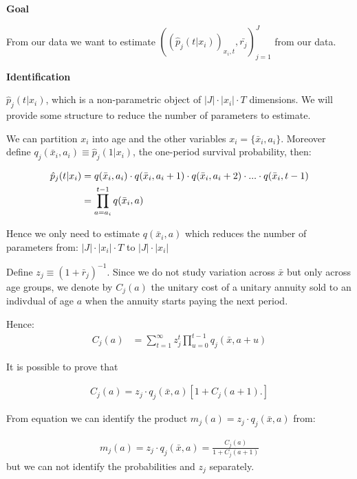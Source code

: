 \documentclass[12pt]{article}
\theoremstyle{plain}
\theoremstyle{plain}
\begin{document}
\textbf{Goal}

From our data we want to estimate 
$((\hat{p}_{j}(t|x_{i}))_{x_i,t},  \bar{r_{j}})_{j=1}^J$ from our data.

\textbf{Identification}


$\hat{p}_{j}(t|x_{i})$, which is a non-parametric object of $|J|\cdot |x_{i}|\cdot T$ dimensions. We will provide some structure to reduce the number of parameters to estimate.  

We can partition $x_{i}$ into age and the other variables $x_{i}=\{\bar{x}_i, a_i\}$. Moreover define $q_{j}(\bar{x}_i, a_i) \equiv \hat{p}_{j}(1|x_i) $, the one-period survival probability, then: 

\begin{align}\label{eq:mort_form}
    \hat{p}_{j}(t|x_i) &= q(\bar{x}_i, a_i)\cdot q(\bar{x}_i, a_i+1) \cdot q(\bar{x}_i, a_i+2) \cdot ... \cdot q(\bar{x}_i, t-1) \notag \\
    &= \prod_{a= a_i}^{t-1}q(\bar{x}_i, a)
\end{align}

Hence we only need to estimate $q(\bar{x}_i, a)$
which reduces the number of parameters from: $|J|\cdot |x_{i}|\cdot T$  to $|J|\cdot |x_{i}|$ 

Define $z_j \equiv (1+\bar{r}_j)^{-1}$. Since we do not study variation across $\bar{x}$ but only across age groups, we denote by $C_j(a)$ the unitary cost of a unitary annuity sold to an indivdual of age $a$ when the annuity starts paying the next period. 

Hence: 
\begin{align}\label{eq:ident_costs}
    C_j(a) &= \sum_{t=1}^{\infty} z_j^t \prod_{u=0}^{t-1} q_j(\bar{x}, a+u) 
\end{align}

It is possible to prove that 


\begin{align}\label{eq:identification1}
    C_j(a) = z_j \cdot q_j(\bar{x}, a)[1+C_j(a+1).]
\end{align}

From equation \label{eq:identification1} we can identify the product $m_j(a) = z_j\cdot q_j(\bar{x}, a)$ from: 

\begin{align}\label{eq:identification2}
     m_j(a) =z_j \cdot q_j(\bar{x}, a)=\frac{C_j(a)}{1+C_j(a+1)}
\end{align}
but we can not identify the probabilities and $z_j$ separately.
\end{document}
